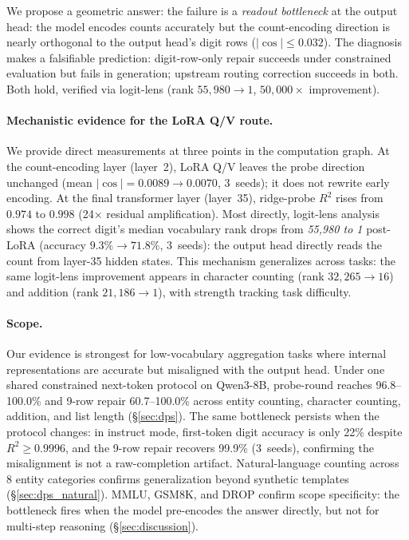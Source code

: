 \documentclass{article}
\begin{document}
We propose a geometric answer: the failure is a \emph{readout bottleneck} at the
output head: the model encodes counts accurately but the count-encoding direction
is nearly orthogonal to the output head's digit rows ($|\cos|\leq 0.032$).
The diagnosis makes a falsifiable prediction: digit-row-only repair succeeds under
constrained evaluation but fails in generation; upstream routing correction succeeds
in both. Both hold, verified via logit-lens (rank $55{,}980{\to}1$, $50{,}000\times$ improvement).

\paragraph{Mechanistic evidence for the LoRA Q/V route.}
We provide direct measurements at three points in the computation graph.
At the count-encoding layer (layer~2), LoRA Q/V leaves the probe direction unchanged
(mean $|\cos| = 0.0089 \to 0.0070$, 3~seeds); it does not rewrite early encoding.
At the final transformer layer (layer~35), ridge-probe $R^2$ rises from $0.974$ to
$0.998$ (24$\times$ residual amplification).
Most directly, logit-lens analysis shows the correct digit's median vocabulary rank
drops from \emph{55{,}980 to 1} post-LoRA (accuracy $9.3\% \to 71.8\%$, 3~seeds):
the output head directly reads the count from layer-35 hidden states.
This mechanism generalizes across tasks: the same logit-lens improvement appears
in character counting (rank $32{,}265 \to 16$) and addition (rank $21{,}186 \to 1$),
with strength tracking task difficulty.

\paragraph{Scope.}
Our evidence is strongest for low-vocabulary aggregation tasks where internal
representations are accurate but misaligned with the output head.
Under one shared constrained next-token protocol on Qwen3-8B, probe-round reaches 96.8--100.0\%
and 9-row repair 60.7--100.0\% across entity counting, character counting, addition,
and list length (\S\ref{sec:dps}).
The same bottleneck persists when the protocol changes: in instruct mode, first-token
digit accuracy is only 22\% despite $R^2 \geq 0.9996$, and the 9-row repair recovers
99.9\% (3~seeds), confirming the misalignment is not a raw-completion artifact.
Natural-language counting across 8 entity categories confirms generalization beyond
synthetic templates (\S\ref{sec:dps_natural}).
MMLU, GSM8K, and DROP confirm scope specificity: the bottleneck fires when the model
pre-encodes the answer directly, but not for multi-step reasoning (\S\ref{sec:discussion}).
\end{document}
